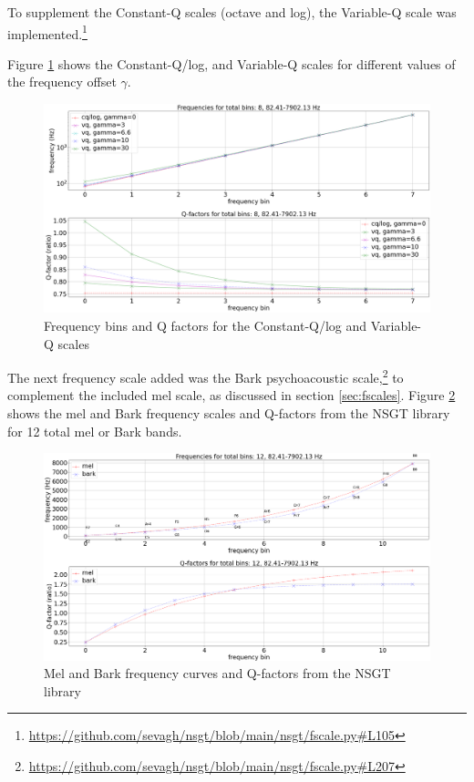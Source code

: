 \documentclass[report.tex]{subfiles}
\begin{document}
To supplement the Constant-Q scales (octave and log), the Variable-Q scale was implemented.\footnote{\url{https://github.com/sevagh/nsgt/blob/main/nsgt/fscale.py\#L105}}

Figure \ref{fig:vq} shows the Constant-Q/log, and Variable-Q scales for different values of the frequency offset $\gamma$.

\begin{figure}[ht]
	\centering
	\includegraphics[width=\textwidth]{./images-freqscales/vqlog.png}
	\caption{Frequency bins and Q factors for the Constant-Q/log and Variable-Q scales}
	\label{fig:vq}
\end{figure}

The next frequency scale added was the Bark psychoacoustic scale,\footnote{\url{https://github.com/sevagh/nsgt/blob/main/nsgt/fscale.py\#L207}} to complement the included mel scale, as discussed in section \ref{sec:fscales}. Figure \ref{fig:melbarkfsandqs} shows the mel and Bark frequency scales and Q-factors from the NSGT library for 12 total mel or Bark bands.

\begin{figure}[ht]
	\centering
	\includegraphics[width=\textwidth]{./images-freqscales/melbarkpitchesqs.png}
	\caption{Mel and Bark frequency curves and Q-factors from the NSGT library}
	\label{fig:melbarkfsandqs}
\end{figure}
\end{document}
